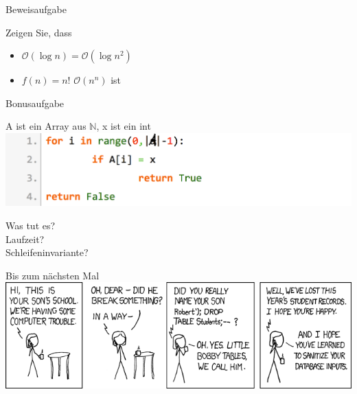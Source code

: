 \documentclass[18pt]{beamer}
\begin{document}
	\begin{frame}{Beweisaufgabe}
		\begin{exampleblock}{Zeigen Sie, dass}
			\begin{itemize}
				\item $ \mathcal{O}( \log{n}) = \mathcal{O}( \log{n ^{2}} ) $
				\item $ f(n) =  n! $ \in $ \mathcal{O} ( n ^{n}) $ ist
			\end{itemize}
		\end{exampleblock}
	\end{frame}


	\begin{frame}{Bonusaufgabe}

		A ist ein Array aus $\mathbb{N}$, x ist ein int \\
		\includegraphics[align=center, scale=0.25]{pics/pseudocode02.png}
		


		Was tut es? \\
		Laufzeit? \\
		Schleifeninvariante?	
	\end{frame}

	\begin{frame}{Bis zum nächsten Mal}
		\includegraphics[align=center, scale=0.5]{pics/exploits_of_a_mom.png}
	\end{frame}
\end{document}

